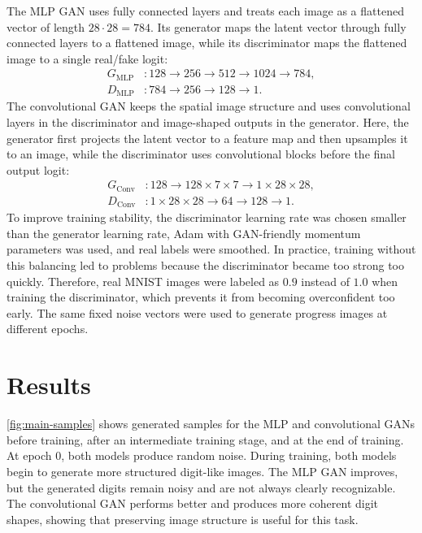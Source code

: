 The MLP GAN uses fully connected layers and treats each image as a flattened vector of length $28 \cdot 28 = 784$.
Its generator maps the latent vector through fully connected layers to a flattened image, while its discriminator maps the flattened image to a single real/fake logit:
\begin{equation*}
\begin{aligned}
    G_{\mathrm{MLP}} &: 128 \rightarrow 256 \rightarrow 512 \rightarrow 1024 \rightarrow 784,\\
    D_{\mathrm{MLP}} &: 784 \rightarrow 256 \rightarrow 128 \rightarrow 1.
\end{aligned}
\end{equation*}
The convolutional GAN keeps the spatial image structure and uses convolutional layers in the discriminator and image-shaped outputs in the generator.
Here, the generator first projects the latent vector to a feature map and then upsamples it to an image, while the discriminator uses convolutional blocks before the final output logit:
\begin{equation*}
\begin{aligned}
    G_{\mathrm{Conv}} &: 128 \rightarrow 128 \times 7 \times 7 \rightarrow 1 \times 28 \times 28,\\
    D_{\mathrm{Conv}} &: 1 \times 28 \times 28 \rightarrow 64 \rightarrow 128 \rightarrow 1.
\end{aligned}
\end{equation*}
To improve training stability, the discriminator learning rate was chosen smaller than the generator learning rate, Adam with GAN-friendly momentum parameters was used, and real labels were smoothed.
In practice, training without this balancing led to problems because the discriminator became too strong too quickly.
Therefore, real MNIST images were labeled as $0.9$ instead of $1.0$ when training the discriminator, which prevents it from becoming overconfident too early.
The same fixed noise vectors were used to generate progress images at different epochs.

\section{Results}

\autoref{fig:main-samples} shows generated samples for the MLP and convolutional GANs before training, after an intermediate training stage, and at the end of training.
At epoch 0, both models produce random noise. During training, both models begin to generate more structured digit-like images.
The MLP GAN improves, but the generated digits remain noisy and are not always clearly recognizable. The convolutional GAN performs better and produces more coherent digit shapes, showing that preserving image structure is useful for this task.

